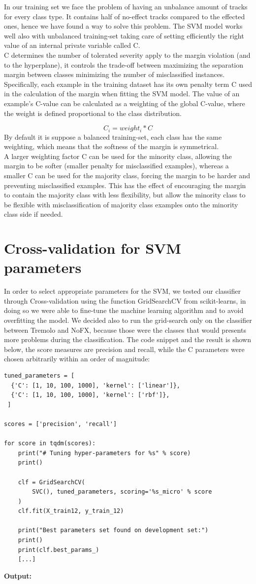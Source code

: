 \documentclass[a4paper,12pt]{report}
\begin{document}
In our training set we face the problem of having an unbalance amount of tracks for every class type. It contains half of no-effect tracks compared to the effected ones, hence we have found a way to solve this problem. The SVM model works well also with unbalanced training-set taking care of setting efficiently the right value of an internal private variable called C.\\ C  determines the number of tolerated severity apply to the margin violation (and to the hyperplane), it controls the trade-off between maximizing the separation margin between classes minimizing the number of misclassified instances.
Specifically, each example in the training dataset has its own penalty term C used in the calculation of the margin when fitting the SVM model. The value of an example’s C-value can be calculated as a weighting of the global C-value, where the weight is defined proportional to the class distribution. 

$$C_i = weight_i * C$$
By default it is suppose a balanced training-set, each class has the same weighting, which means that the softness of the margin is symmetrical.\\ A larger weighting factor C can be used for the minority class, allowing the margin to be softer (smaller penalty for misclassified examples), whereas a smaller C can be used for the majority class, forcing the margin to be harder and preventing misclassified examples.
This has the effect of encouraging the margin to contain the majority class with less flexibility, but allow the minority class to be flexible with misclassification of majority class examples onto the minority class side if needed.

\section{Cross-validation for SVM parameters}
In order to select appropriate parameters for the SVM, we tested our classifier through Cross-validation using the function GridSearchCV from scikit-learns, in doing so we were able to fine-tune the machine learning algorithm and to avoid overfitting the model. We decided also to run the grid-search only on the classifier between Tremolo and NoFX, because those were the classes that would presents more problems during the classification. The code snippet and the result is shown below, the score measures are precision and recall, while the C parameters were chosen arbitrarily within an order of magnitude:
\begin{verbatim}
tuned_parameters = [
  {'C': [1, 10, 100, 1000], 'kernel': ['linear']},
  {'C': [1, 10, 100, 1000], 'kernel': ['rbf']},
 ]

scores = ['precision', 'recall']

for score in tqdm(scores):
    print("# Tuning hyper-parameters for %s" % score)
    print()

    clf = GridSearchCV(
        SVC(), tuned_parameters, scoring='%s_micro' % score
    )
    clf.fit(X_train12, y_train_12)

    print("Best parameters set found on development set:")
    print()
    print(clf.best_params_)
    [...]
\end{verbatim}
\hfill \break
\textbf{Output:}
\end{document}
